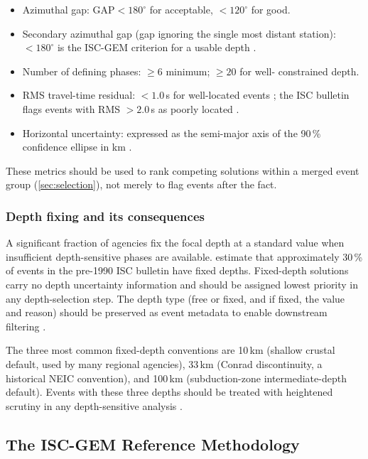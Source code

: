 \documentclass[12pt]{article}
\begin{document}
\begin{itemize}
  \item Azimuthal gap: $\text{GAP} < 180^\circ$ for acceptable, $< 120^\circ$
        for good.
  \item Secondary azimuthal gap (gap ignoring the single most distant station):
        $< 180^\circ$ is the ISC-GEM criterion for a usable depth
        \citep{ISCGEM2018}.
  \item Number of defining phases: $\geq 6$ minimum; $\geq 20$ for well-
        constrained depth.
  \item RMS travel-time residual: $< 1.0$\,s for well-located events
        \citep{Bondar2011}; the ISC bulletin flags events with
        RMS $> 2.0$\,s as poorly located \citep{ISCBulletinRebuild2020}.
  \item Horizontal uncertainty: expressed as the semi-major axis of the 90\,\%
        confidence ellipse in km \citep{Bondar2004}.
\end{itemize}

These metrics should be used to rank competing solutions within a merged
event group (\cref{sec:selection}), not merely to flag events after the
fact.

\subsubsection{Depth fixing and its consequences}
\label{sec:depthfix}

A significant fraction of agencies fix the focal depth at a standard value when
insufficient depth-sensitive phases are available.  \citet{Engdahl2020} estimate
that approximately 30\,\% of events in the pre-1990 ISC bulletin have fixed
depths.  Fixed-depth solutions carry no depth uncertainty information and should
be assigned lowest priority in any depth-selection step.  The depth type
(free or fixed, and if fixed, the value and reason) should be preserved as event
metadata to enable downstream filtering \citep{ISCGEM2018, Engdahl2020}.

The three most common fixed-depth conventions are 10\,km (shallow crustal
default, used by many regional agencies), 33\,km (Conrad discontinuity, a
historical NEIC convention), and 100\,km (subduction-zone intermediate-depth
default).  Events with these three depths should be treated with heightened
scrutiny in any depth-sensitive analysis \citep{Engdahl1998}.

\subsection{The ISC-GEM Reference Methodology}
\label{sec:iscgem}
\end{document}
